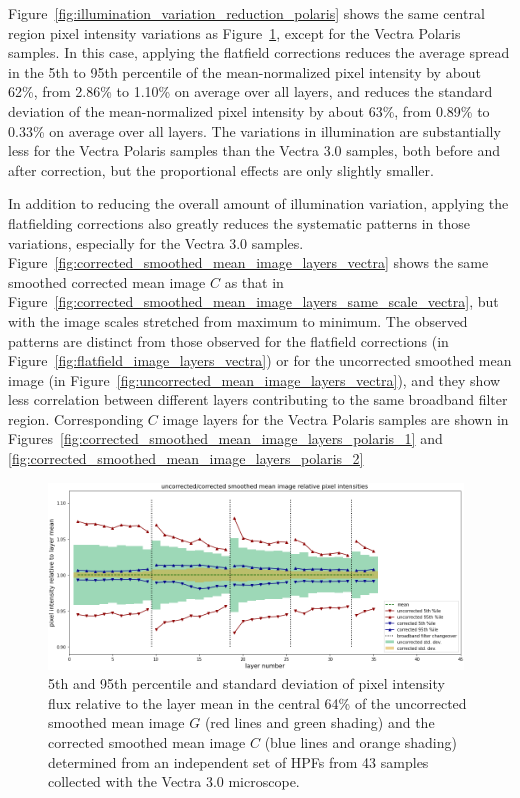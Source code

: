 \documentclass[letterpaper,11pt]{article}
\newcommand{\reffig}[1]{Figure~\ref{#1}}
\begin{document}
\reffig{fig:illumination_variation_reduction_polaris} shows the same central region pixel intensity variations as \reffig{fig:illumination_variation_reduction_vectra}, except for the Vectra Polaris samples. In this case, applying the flatfield corrections reduces the average spread in the 5th to 95th percentile of the mean-normalized pixel intensity by about 62\%, from 2.86\% to 1.10\% on average over all layers, and reduces the standard deviation of the mean-normalized pixel intensity by about 63\%, from 0.89\% to 0.33\% on average over all layers. The variations in illumination are substantially less for the Vectra Polaris samples than the Vectra 3.0 samples, both before and after correction, but the proportional effects are only slightly smaller.

In addition to reducing the overall amount of illumination variation, applying the flatfielding corrections also greatly reduces the systematic patterns in those variations, especially for the Vectra 3.0 samples. \reffig{fig:corrected_smoothed_mean_image_layers_vectra} shows the same smoothed corrected mean image $C$ as that in \reffig{fig:corrected_smoothed_mean_image_layers_same_scale_vectra}, but with the image scales stretched from maximum to minimum. The observed patterns are distinct from those observed for the flatfield corrections (in \reffig{fig:flatfield_image_layers_vectra}) or for the uncorrected smoothed mean image (in \reffig{fig:uncorrected_mean_image_layers_vectra}), and they show less correlation between different layers contributing to the same broadband filter region. Corresponding $C$ image layers for the Vectra Polaris samples are shown in Figures~\ref{fig:corrected_smoothed_mean_image_layers_polaris_1} and \ref{fig:corrected_smoothed_mean_image_layers_polaris_2}

\clearpage

\begin{figure}[!ht]
\centering
\includegraphics[width=0.98\textwidth]{images/results/illumination_variation_reduction_vectra}
\caption{\footnotesize 5th and 95th percentile and standard deviation of pixel intensity flux relative to the layer mean in the central 64\% of the uncorrected smoothed mean image $G$ (red lines and green shading) and the corrected smoothed mean image $C$ (blue lines and orange shading) determined from an independent set of HPFs from 43 samples collected with the Vectra 3.0 microscope.}
\label{fig:illumination_variation_reduction_vectra}
\end{figure} 
\end{document}
